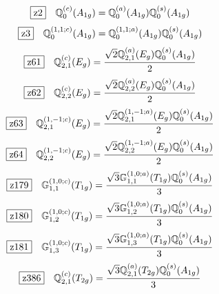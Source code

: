 \documentclass[fleqn,10pt,landscape]{jsarticle}
\begin{document}
\begin{dmath*}
\hspace*{3mm}\fbox{z2}\quad \mathbb{Q}_{0}^{(c)}(A_{1g})=\mathbb{Q}_{0}^{(a)}(A_{1g}) \mathbb{Q}_{0}^{(s)}(A_{1g})
\end{dmath*}
\begin{dmath*}
\hspace*{3mm}\fbox{z3}\quad \mathbb{Q}_{0}^{(1,1;c)}(A_{1g})=\mathbb{Q}_{0}^{(1,1;a)}(A_{1g}) \mathbb{Q}_{0}^{(s)}(A_{1g})
\end{dmath*}
\begin{dmath*}
\hspace*{3mm}\fbox{z61}\quad \mathbb{Q}_{2,1}^{(c)}(E_{g})=\frac{\sqrt{2} \mathbb{Q}_{2,1}^{(a)}(E_{g}) \mathbb{Q}_{0}^{(s)}(A_{1g})}{2}
\end{dmath*}
\begin{dmath*}
\hspace*{3mm}\fbox{z62}\quad \mathbb{Q}_{2,2}^{(c)}(E_{g})=\frac{\sqrt{2} \mathbb{Q}_{2,2}^{(a)}(E_{g}) \mathbb{Q}_{0}^{(s)}(A_{1g})}{2}
\end{dmath*}
\begin{dmath*}
\hspace*{3mm}\fbox{z63}\quad \mathbb{Q}_{2,1}^{(1,-1;c)}(E_{g})=\frac{\sqrt{2} \mathbb{Q}_{2,1}^{(1,-1;a)}(E_{g}) \mathbb{Q}_{0}^{(s)}(A_{1g})}{2}
\end{dmath*}
\begin{dmath*}
\hspace*{3mm}\fbox{z64}\quad \mathbb{Q}_{2,2}^{(1,-1;c)}(E_{g})=\frac{\sqrt{2} \mathbb{Q}_{2,2}^{(1,-1;a)}(E_{g}) \mathbb{Q}_{0}^{(s)}(A_{1g})}{2}
\end{dmath*}
\begin{dmath*}
\hspace*{3mm}\fbox{z179}\quad \mathbb{G}_{1,1}^{(1,0;c)}(T_{1g})=\frac{\sqrt{3} \mathbb{G}_{1,1}^{(1,0;a)}(T_{1g}) \mathbb{Q}_{0}^{(s)}(A_{1g})}{3}
\end{dmath*}
\begin{dmath*}
\hspace*{3mm}\fbox{z180}\quad \mathbb{G}_{1,2}^{(1,0;c)}(T_{1g})=\frac{\sqrt{3} \mathbb{G}_{1,2}^{(1,0;a)}(T_{1g}) \mathbb{Q}_{0}^{(s)}(A_{1g})}{3}
\end{dmath*}
\begin{dmath*}
\hspace*{3mm}\fbox{z181}\quad \mathbb{G}_{1,3}^{(1,0;c)}(T_{1g})=\frac{\sqrt{3} \mathbb{G}_{1,3}^{(1,0;a)}(T_{1g}) \mathbb{Q}_{0}^{(s)}(A_{1g})}{3}
\end{dmath*}
\begin{dmath*}
\hspace*{3mm}\fbox{z386}\quad \mathbb{Q}_{2,1}^{(c)}(T_{2g})=\frac{\sqrt{3} \mathbb{Q}_{2,1}^{(a)}(T_{2g}) \mathbb{Q}_{0}^{(s)}(A_{1g})}{3}
\end{dmath*}
\end{document}
